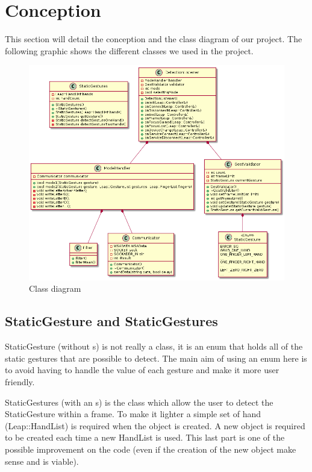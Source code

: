 \section{Conception}

This section will detail the conception and the class diagram of our project. The following graphic shows the different classes we used in the project.

\begin{figure}[H]
 \centering
 \includegraphics[scale=0.5]{../uml/classDiagram.png}
 \caption{Class diagram}
\end{figure}

\subsection{StaticGesture and StaticGestures}

StaticGesture (without s) is not really a class, it is an enum that holds all of the static gestures that are possible to detect. The main aim of using an enum here is to avoid having to handle the value of each gesture and make it more user friendly.

StaticGestures (with an s) is the class which allow the user to detect the StaticGesture within a frame. To make it lighter a simple set of hand (Leap::HandList) is required when the object is created. A new object is required to be created each time a new HandList is used. This last part is one of the possible improvement on the code (even if the creation of the new object make sense and is viable).

